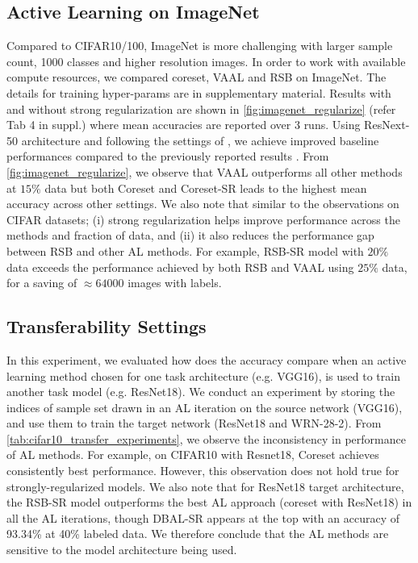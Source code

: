 \documentclass[10pt,twocolumn,letterpaper]{article}
\begin{document}
\subsection{Active Learning on ImageNet}
Compared to CIFAR10/100, ImageNet is more challenging with larger sample count, 1000 classes and higher resolution images. In order to work with available compute resources, we compared coreset, VAAL and RSB on ImageNet. The details for training hyper-params are in supplementary material. Results with and without strong regularization are shown in \cref{fig:imagenet_regularize} (refer Tab 4 in suppl.) where mean accuracies are reported over 3 runs. Using ResNext-50 architecture \cite{resnext_50_xie2017aggregated} and following the settings of  \cite{S4L_DBLP:journals/corr/abs-1905-03670}, we achieve improved baseline performances compared to the previously reported results \cite{Ensembles_Beluch2018ThePO, VAAL_sinha2019variational}.
From \cref{fig:imagenet_regularize}, we observe that VAAL outperforms all other methods at $15\%$ data but both Coreset and Coreset-SR leads to the highest mean accuracy across other settings. We also note that similar to the observations on CIFAR datasets; (i) strong regularization helps improve performance across the methods and fraction of data, and (ii) it also reduces the performance gap between RSB and other AL methods. For example, RSB-SR model with $20\%$ data exceeds the performance achieved by both RSB and VAAL using $25\%$ data, for a saving of $\approx64000$ images with labels.

\label{subsection:transfer_settings}
\subsection{Transferability Settings}
In this experiment, we evaluated how does the accuracy compare when an active learning method chosen for one task architecture (e.g. VGG16), is used to train another task model (e.g. ResNet18). We conduct an experiment by storing the indices of sample set drawn in an AL iteration on the source network (VGG16), and use them to train the target network (ResNet18 and WRN-28-2). From \cref{tab:cifar10_transfer_experiments}, we observe the inconsistency in performance of AL methods. For example, 
on CIFAR10 with Resnet18, Coreset achieves consistently best performance. However, this observation does not hold true for strongly-regularized models. We also note that for ResNet18 target architecture, the RSB-SR model outperforms the best AL approach (coreset with ResNet18) in all the AL iterations, though DBAL-SR appears at the top with an accuracy of 93.34\% at 40\% labeled data. We therefore conclude that the AL methods are sensitive to the model architecture being used.
\end{document}
